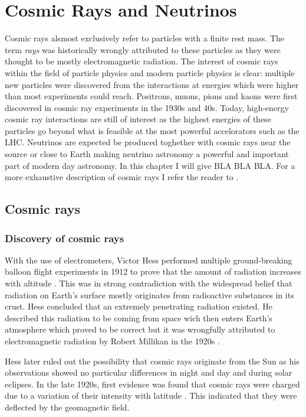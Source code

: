 \chapter{Cosmic Rays and Neutrinos}
Cosmic rays alsmost exclusively refer to particles with a finite rest mass. The term \textit{rays} was historically wrongly attributed to these particles as they were thought to be mostly electromagnetic radiation.
The interest of cosmic rays within the field of particle physics and modern particle physics is clear: multiple new particles were discovered from the interactions at energies which were higher than most experiments could reach. Positrons, muons, pions and kaons were first discovered in cosmic ray experiments in the 1930s and 40s. Today, high-energy cosmic ray interactions are still of interest as the highest energies of these particles go beyond what is feasible at the most powerful accelorators such as the LHC. Neutrinos are expected be produced toghether with cosmic rays near the source or close to Earth making neutrino astronomy a powerful and important part of modern day astronomy. In this chapter I will give BLA BLA BLA. For a more exhaustive description of cosmic rays I refer the reader to \cite{Gaisser:2016uoy}.

\section{Cosmic rays}
\subsection{Discovery of cosmic rays}
With the use of electrometers, Victor Hess performed multiple ground-breaking balloon flight experiments in 1912 to prove that the amount of radiation increases with altitude \cite{hessnobel:1936}. This was in strong contradiction with the widespread belief that radiation on Earth's surface mostly originates from radioactive substances in its crust. Hess concluded that an extremely penetrating radiation existed. He described this radiation to be coming from space wich then enters Earth's atmosphere which proved to be correct but it was wrongfully attributed to electromagnetic radiation by Robert Millikan in the 1920s \cite{PhysRev.32.533}. 

Hess later ruled out the possibility that cosmic rays originate from the Sun as his observations showed no particular differences in night and day and during solar eclipses. In the late 1920s, first evidence was found that cosmic rays were charged due to a variation of their intensity with latitude \cite{clay:1927a}. This indicated that they were deflected by the geomagnetic field.


